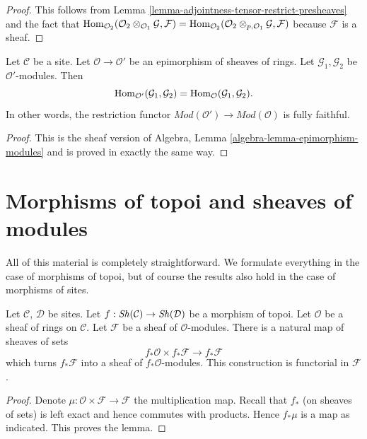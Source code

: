 \begin{proof}
This follows from
Lemma \ref{lemma-adjointness-tensor-restrict-presheaves}
and the fact that
$\mathop{\mathrm{Hom}}\nolimits_{\mathcal{O}_2}(
\mathcal{O}_2 \otimes_{\mathcal{O}_1} \mathcal{G},
\mathcal{F}
)
=
\mathop{\mathrm{Hom}}\nolimits_{\mathcal{O}_2}(
\mathcal{O}_2 \otimes_{p, \mathcal{O}_1} \mathcal{G},
\mathcal{F}
)$
because $\mathcal{F}$ is a sheaf.
\end{proof}

\begin{lemma}
\label{lemma-epimorphism-modules}
Let $\mathcal{C}$ be a site.
Let $\mathcal{O} \to \mathcal{O}'$ be an epimorphism of sheaves of rings.
Let $\mathcal{G}_1, \mathcal{G}_2$ be $\mathcal{O}'$-modules.
Then
$$
\mathop{\mathrm{Hom}}\nolimits_{\mathcal{O}'}(\mathcal{G}_1, \mathcal{G}_2) =
\mathop{\mathrm{Hom}}\nolimits_\mathcal{O}(\mathcal{G}_1, \mathcal{G}_2).
$$
In other words, the restriction functor
$\textit{Mod}(\mathcal{O}') \to \textit{Mod}(\mathcal{O})$ is fully faithful.
\end{lemma}

\begin{proof}
This is the sheaf version of
Algebra, Lemma \ref{algebra-lemma-epimorphism-modules}
and is proved in exactly the same way.
\end{proof}




\section{Morphisms of topoi and sheaves of modules}
\label{section-sheaves-modules-functorial}

\noindent
All of this material is completely straightforward.
We formulate everything in the case of morphisms of topoi,
but of course the results also hold in the case of morphisms of sites.

\begin{lemma}
\label{lemma-pushforward-module}
Let $\mathcal{C}$, $\mathcal{D}$ be sites.
Let $f : \mathop{\mathit{Sh}}\nolimits(\mathcal{C}) \to \mathop{\mathit{Sh}}\nolimits(\mathcal{D})$
be a morphism of topoi.
Let $\mathcal{O}$ be a sheaf of rings on $\mathcal{C}$.
Let $\mathcal{F}$ be a sheaf of $\mathcal{O}$-modules.
There is a natural map of sheaves of sets
$$
f_*\mathcal{O} \times f_*\mathcal{F}
\longrightarrow
f_*\mathcal{F}
$$
which turns $f_*\mathcal{F}$ into a sheaf of $f_*\mathcal{O}$-modules.
This construction is functorial in $\mathcal{F}$.
\end{lemma}

\begin{proof}
Denote $\mu : \mathcal{O} \times \mathcal{F} \to \mathcal{F}$ the
multiplication map. Recall that $f_*$ (on sheaves of sets) is left exact
and hence commutes with products. Hence $f_*\mu$ is a map as
indicated. This proves the lemma.
\end{proof}

